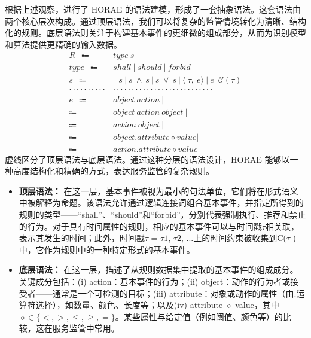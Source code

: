 根据上述观察，进行了 HORAE 的语法建模，形成了一套抽象语法。这套语法由两个核心层次构成。通过顶层语法，我们可以将复杂的监管情境转化为清晰、结构化的规则。底层语法则关注于构建基本事件的更细微的组成部分，从而为识别模型和算法提供更精确的输入数据。
\begin{align*}
    R \ \  \Coloneqq \ \  & type~s \tag{typed rule}\\
    type \ \  \Coloneqq \ \  & shall~|~should~|~forbid \tag{predefined types}\\
    s \ \  \Coloneqq \ \  &  \neg s~|~s~ \land~ s ~|~s~ \lor~ s ~|~
    \langle~\tau,~e \rangle~|~e~|\mathcal{C}(\tau) \tag{statement}\\
    \cdot \cdot \cdot \cdot\cdot\cdot\cdot\cdot\cdot\cdot & \cdot\cdot\cdot\cdot\cdot\cdot\cdot\cdot\cdot\cdot\cdot\cdot\cdot\cdot\cdot\cdot\cdot\cdot \cdot \cdot \cdot \cdot \cdot \cdot \cdot \cdot\cdot\\
    e \ \  \Coloneqq \ \  & object~action~| \tag{patterned event}\\
    \Coloneqq \ \  & object~action~object~|\\
    \Coloneqq \ \  & action~object~|\\
    \Coloneqq \ \  & object. attribute \diamond value|\\
    \Coloneqq \ \  & action. attribute \diamond value
\end{align*}
虚线区分了顶层语法与底层语法。通过这种分层的语法设计，HORAE 能够以一种高度结构化和精确的方式，表达服务监管的复杂规则。



\begin{itemize}
    \item \textbf{顶层语法：} 在这一层，基本事件被视为最小的句法单位，它们将在形式语义中被解释为命题。该语法允许通过逻辑连接词组合基本事件，并指定所得到的规则的类型——“shall”、“should”和“forbid”，分别代表强制执行、推荐和禁止的行为。对于具有时间属性的规则，相应的基本事件可以与时间戳$\tau$相关联，表示其发生的时间；此外，时间戳$\tau$ = {$\tau1$, $\tau2$, ...}上的时间约束被收集到C($\tau$ )中，它作为规则中的一种特定形式的基本事件。
    \item \textbf{底层语法：} 在这一层，描述了从规则数据集中提取的基本事件的组成成分。关键成分包括：(i) action：基本事件的行为；(ii) object：动作的行为者或接受者——通常是一个可检测的目标；(iii) attribute：对象或动作的属性（由.运算符选择），如数量、颜色、长度等；以及(iv) attribute $\diamond$ value，其中$\diamond \in \{<, >, \leq, \geq, =\}$。某些属性与给定值（例如阈值、颜色等）的比较，这在服务监管中常用。
\end{itemize}

